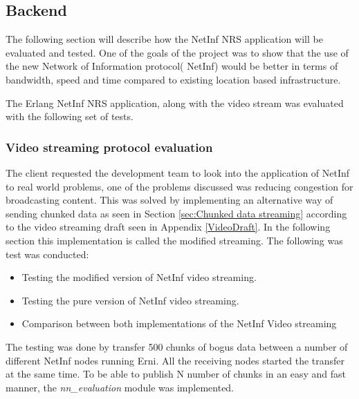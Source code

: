 \subsection{Backend}

The following section will describe how the NetInf NRS application will be evaluated and tested. One of the goals of the project was to show that the use of the new Network of Information protocol( NetInf) would be better in terms of bandwidth, speed and time compared to existing location based infrastructure. 

The Erlang NetInf NRS application, along with the video stream was evaluated with the following set of tests. 


\subsubsection{Video streaming protocol evaluation}
The client requested the development team to look into the application of NetInf to real world problems, one of the problems discussed was reducing congestion for broadcasting content. This was solved by implementing an alternative way of sending chunked data as seen in Section \ref{sec:Chunked data streaming} according to the video streaming draft seen in Appendix \ref{VideoDraft}. In the following section this implementation is called the modified streaming. The following was test was conducted:

\begin{itemize}
\item Testing the modified version of NetInf video streaming. 
\item Testing the pure version of NetInf video streaming.
\item Comparison between both implementations of the NetInf Video streaming
\end{itemize}

The testing was done by transfer 500 chunks of bogus data between a number of different NetInf nodes running Erni. All the receiving nodes started the transfer at the same time. To be able to publish N number of chunks in an easy and fast manner, the \textit{nn\_evaluation} module was implemented.


